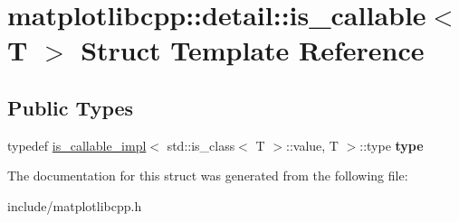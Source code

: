\hypertarget{structmatplotlibcpp_1_1detail_1_1is__callable}{}\section{matplotlibcpp\+:\+:detail\+:\+:is\+\_\+callable$<$ T $>$ Struct Template Reference}
\label{structmatplotlibcpp_1_1detail_1_1is__callable}
\subsection*{Public Types}
\begin{DoxyCompactItemize}
\item 
typedef \hyperlink{structmatplotlibcpp_1_1detail_1_1is__callable__impl}{is\+\_\+callable\+\_\+impl}$<$ std\+::is\+\_\+class$<$ T $>$\+::value, T $>$\+::type {\bfseries type}\hypertarget{structmatplotlibcpp_1_1detail_1_1is__callable_abddc65f95805f85d5619f31cce0fbaa9}{}\label{structmatplotlibcpp_1_1detail_1_1is__callable_abddc65f95805f85d5619f31cce0fbaa9}

\end{DoxyCompactItemize}


The documentation for this struct was generated from the following file\+:\begin{DoxyCompactItemize}
\item 
include/matplotlibcpp.\+h\end{DoxyCompactItemize}
